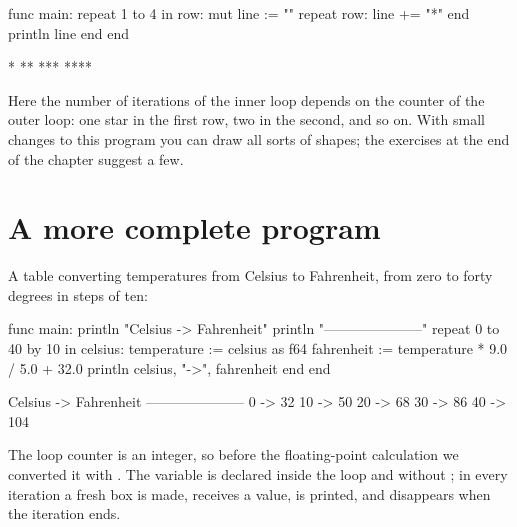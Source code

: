\begin{salamcode}
func main:
    repeat 1 to 4 in row:
        mut line := ""
        repeat row:
            line += "*"
        end
        println line
    end
end
\end{salamcode}

\begin{salamout}
*
**
***
****
\end{salamout}

Here the number of iterations of the inner loop depends on the counter of
the outer loop: one star in the first row, two in the second, and so on. With
small changes to this program you can draw all sorts of shapes; the exercises
at the end of the chapter suggest a few.

\section{A more complete program}

A table converting temperatures from Celsius to Fahrenheit, from zero to
forty degrees in steps of ten:

\begin{salamcode}
func main:
    println "Celsius -> Fahrenheit"
    println "---------------------"
    repeat 0 to 40 by 10 in celsius:
        temperature := celsius as f64
        fahrenheit := temperature * 9.0 / 5.0 + 32.0
        println celsius, "->", fahrenheit
    end
end
\end{salamcode}

\begin{salamout}
Celsius -> Fahrenheit
---------------------
0 -> 32
10 -> 50
20 -> 68
30 -> 86
40 -> 104
\end{salamout}

The loop counter is an integer, so before the floating-point calculation we
converted it with . The variable  is declared
inside the loop and without ; in every iteration a fresh box is
made, receives a value, is printed, and disappears when the iteration ends.

